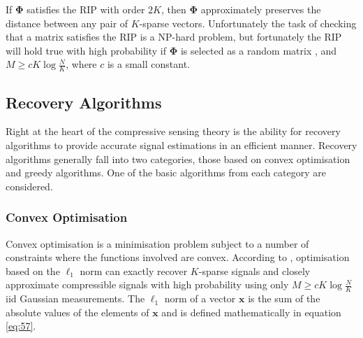 If $\boldsymbol{\Phi}$ satisfies the RIP with order $2K$, then $\boldsymbol{\Phi}$ approximately preserves the distance between any pair of $K$-sparse vectors. Unfortunately the task of checking that a matrix satisfies the RIP is a NP-hard problem, but fortunately the RIP will hold true with high probability if $\boldsymbol{\Phi}$ is selected as a random matrix \citep{Candes2006a}, and $M \geq cK\log \frac{N}{K}$, where $c$ is a small constant. 



\subsection{Recovery Algorithms}
\label{sec:recovery-algorithms}

Right at the heart of the compressive sensing theory is the ability for recovery algorithms to provide accurate signal estimations in an efficient manner. Recovery algorithms generally fall into two categories, those based on convex optimisation and greedy algorithms. One of the basic algorithms from each category are considered.   

\subsubsection{Convex Optimisation}
\label{sec:convex-optimization}

Convex optimisation is a minimisation problem subject to a number of constraints where the functions involved are convex. According to \cite{Baraniuk2007}, optimisation based on the $\ell_1$ norm can exactly recover $K$-sparse signals and closely approximate compressible signals with high probability using only $M  \geq cK \log \frac{N}{K} $ iid Gaussian measurements. The $\ell_1$ norm of a vector $\boldsymbol{x}$ is the sum of the absolute values of the elements of $\boldsymbol{x}$ and is defined mathematically in equation \eqref{eq:57}.  %

